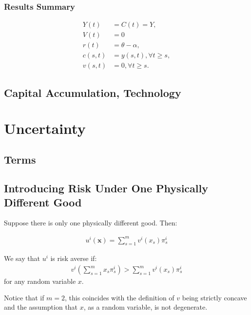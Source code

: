 \documentclass[10pt]{article}
\begin{document}
\subsubsection{Results Summary}

\begin{align}
    Y(t) & =C(t)=Y, \\
    V(t) & =0 \\
    r(t) & =\theta-\alpha, \\
    c(s, t) & =y(s, t), \forall t \geq s, \\
    v(s, t) & =0, \forall t \geq s .
\end{align}

\subsection{Capital Accumulation, Technology}

\section{Uncertainty}

\subsection{Terms}



\subsection{Introducing Risk Under One Physically Different Good}

Suppose there is only one physically different good. Then:

\begin{align}
    u^i(\mathbf{x})=\sum_{s=1}^m v^i\left(x_s\right) \pi_s^i
\end{align}

\begin{definition} 
    We say that $u^i$ is risk averse if:
        \begin{align}
            v^i\left(\sum_{s=1}^m x_s \pi_s^i\right)>\sum_{s=1}^m v^i\left(x_s\right) \pi_s^i
        \end{align}
    for any random variable $x$.
\end{definition}

Notice that if $m=2$, this coincides with the definition of $v$ being strictly concave and the assumption that $x$, as a random variable, is not degenerate.
\end{document}
